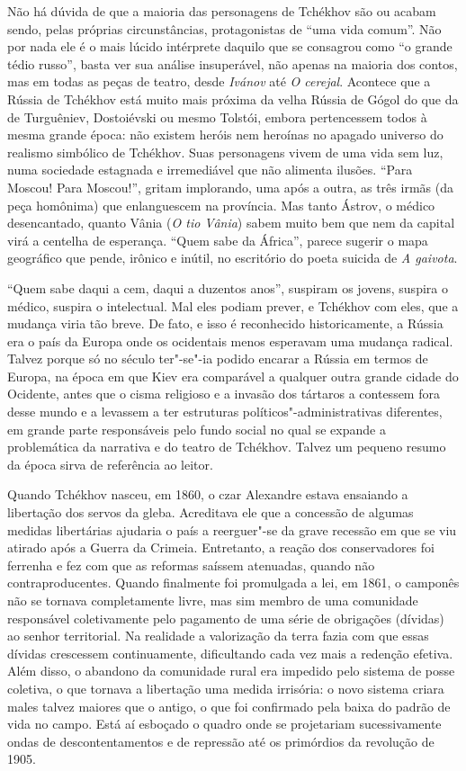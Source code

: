 Não há dúvida de que a maioria das personagens de Tchékhov são ou acabam
sendo, pelas próprias circunstâncias, protagonistas de ``uma vida
comum''. Não por nada ele é o mais lúcido intérprete daquilo que se
consagrou como ``o grande tédio russo'', basta ver sua análise
insuperável, não apenas na maioria dos contos, mas em todas as peças de
teatro, desde \emph{Ivánov} até \emph{O cerejal}. Acontece que a Rússia
de Tchékhov está muito mais próxima da velha Rússia de Gógol do que da
de Turguêniev, Dostoiévski ou mesmo Tolstói, embora pertencessem todos à
mesma grande época: não existem heróis nem heroínas no apagado universo
do realismo simbólico de Tchékhov. Suas personagens vivem de uma vida
sem luz, numa sociedade estagnada e irremediável que não alimenta
ilusões. ``Para Moscou! Para Moscou!'', gritam implorando, uma após a
outra, as três irmãs (da peça homônima) que enlanguescem na província.
Mas tanto Ástrov, o médico desencantado, quanto Vânia (\emph{O tio Vânia})
sabem muito bem que nem da capital virá a centelha de esperança. ``Quem
sabe da África'', parece sugerir o mapa geográfico que pende, irônico
e inútil, no escritório do poeta suicida de \emph{A gaivota}.

``Quem sabe daqui a cem, daqui a duzentos anos'', suspiram os jovens,
suspira o médico, suspira o intelectual. Mal eles podiam prever, e
Tchékhov com eles, que a mudança viria tão breve. De fato, e isso é
reconhecido historicamente, a Rússia era o país da Europa onde os
ocidentais menos esperavam uma mudança radical. Talvez porque só no
século  ter"-se"-ia podido encarar a Rússia em termos de Europa, na época
em que Kiev era comparável a qualquer outra grande cidade do Ocidente,
antes que o cisma religioso e a invasão dos tártaros a contessem fora
desse mundo e a levassem a ter estruturas políticos"-administrativas
diferentes, em grande parte responsáveis pelo fundo social no qual se
expande a problemática da narrativa e do teatro de Tchékhov. Talvez um
pequeno resumo da época sirva de referência ao leitor.

Quando Tchékhov nasceu, em 1860, o czar Alexandre  estava ensaiando a
libertação dos servos da gleba. Acreditava ele que a concessão de
algumas medidas libertárias ajudaria o país a reerguer"-se da grave
recessão em que se viu atirado após a Guerra da Crimeia. Entretanto, a
reação dos conservadores foi ferrenha e fez com que as reformas saíssem
atenuadas, quando não contraproducentes. Quando finalmente foi
promulgada a lei, em 1861, o camponês não se tornava completamente
livre, mas sim membro de uma comunidade responsável coletivamente pelo
pagamento de uma série de obrigações (dívidas) ao senhor territorial. Na realidade a
valorização da terra fazia com que essas dívidas crescessem continuamente,
dificultando cada vez mais a redenção efetiva. Além disso, o abandono da
comunidade rural era impedido pelo sistema de posse coletiva, o que
tornava a libertação uma medida irrisória: o novo sistema criara males talvez maiores que o
antigo, o que foi confirmado pela baixa do padrão de vida no campo. Está aí esboçado o quadro onde se
projetariam sucessivamente ondas de descontentamentos e de repressão até
os primórdios da revolução de 1905.

